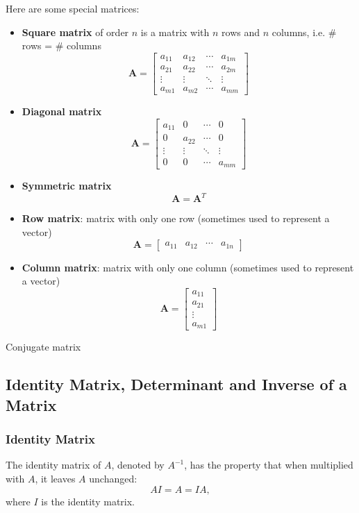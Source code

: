 Here are some special matrices:
\begin{itemize}
\item \textbf{Square matrix} of order $n$ is a matrix with $n$ rows and $n$ columns, i.e. \# rows = \# columns
\[ \mathbf{A} = \begin{bmatrix}
    a_{11} & a_{12} & \cdots & a_{1m} \\
    a_{21} & a_{22} & \cdots & a_{2m} \\
    \vdots & \vdots & \ddots & \vdots \\
    a_{m1} & a_{m2} & \cdots & a_{mm}
\end{bmatrix} \]

\item \textbf{Diagonal matrix}
\[ \mathbf{A} = \begin{bmatrix}
    a_{11} & 0 & \cdots & 0 \\
    0 & a_{22} & \cdots & 0 \\
    \vdots & \vdots & \ddots & \vdots \\
    0 & 0 & \cdots & a_{mm}
\end{bmatrix} \]

\item \textbf{Symmetric matrix}
\[ \mathbf{A} = \mathbf{A}^T \]

\item \textbf{Row matrix}: matrix with only one row (sometimes used to represent a vector)
\[ \mathbf{A} = 
\begin{bmatrix}
    a_{11} & a_{12} & \cdots & a_{1n}
\end{bmatrix} \]

\item \textbf{Column matrix}:  matrix with only one column (sometimes used to represent a vector)
\[ \mathbf{A} = 
\begin{bmatrix}
    a_{11} \\
    a_{21} \\
    \vdots \\
    a_{m1}
\end{bmatrix} \]
\end{itemize}

Conjugate matrix

\subsection{Identity Matrix, Determinant and Inverse of a Matrix}
\subsubsection{Identity Matrix}
The identity matrix of $A$, denoted by $A^{-1}$, has the property that when multiplied with $A$, it leaves $A$ unchanged:
\[ AI=A=IA, \]
where $I$ is the identity matrix.

